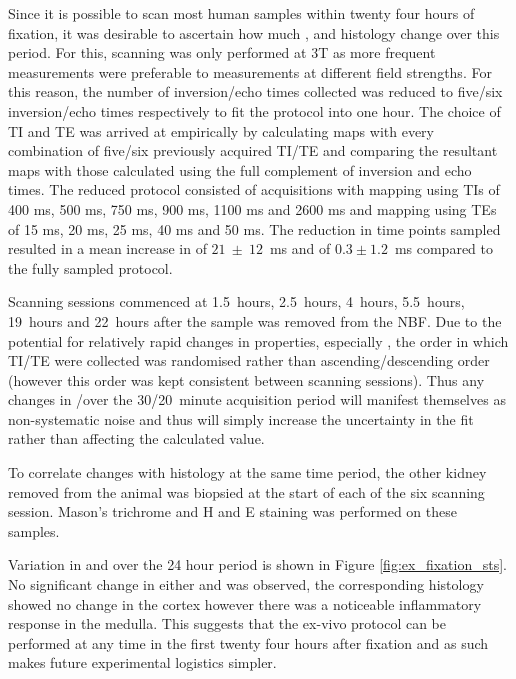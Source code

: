 Since it is possible to scan most human samples within twenty four hours of fixation, it was desirable to ascertain how much \tone, \ttwostar and histology change over this period. For this, scanning was only performed at 3T as more frequent measurements were preferable to measurements at different field strengths. For this reason, the number of inversion/echo times collected was reduced to five/six inversion/echo times respectively to fit the protocol into one hour. The choice of \ac{TI} and \ac{TE} was arrived at empirically by calculating maps with every combination of five/six previously acquired \ac{TI}/\ac{TE} and comparing the resultant maps with those calculated using the full complement of inversion and echo times. The reduced protocol consisted of acquisitions with \tone mapping using \acp{TI} of 400 ms, 500 ms, 750 ms, 900 ms, 1100 ms and 2600 ms and \ttwostar mapping using \acp{TE} of 15 ms, 20 ms, 25 ms, 40 ms and 50 ms. The reduction in time points sampled resulted in a mean increase in \tone of $21~\pm~12$~ms and \ttwostar of $0.3 \pm 1.2$~ms compared to the fully sampled protocol.

Scanning sessions commenced at 1.5~hours, 2.5~hours, 4~hours, 5.5~hours, 19~hours and 22~hours after the sample was removed from the \ac{NBF}. Due to the potential for relatively rapid changes in properties, especially \tone, the order in which \ac{TI}/\ac{TE} were collected was randomised rather than ascending/descending order (however this order was kept consistent between scanning sessions). Thus any changes in \tone/\ttwostar over the 30/20~minute acquisition period will manifest themselves as non-systematic noise and thus will simply increase the uncertainty in the fit rather than affecting the calculated value.

To correlate changes with histology at the same time period, the other kidney removed from the animal was biopsied at the start of each of the six scanning session. Mason's trichrome and \ac{H and E} staining was performed on these samples.

Variation in \tone and \ttwostar over the 24 hour period is shown in Figure \ref{fig:ex_fixation_sts}. No significant change in either \tone and \ttwostar was observed, the corresponding histology showed no change in the cortex however there was a noticeable inflammatory response in the medulla. This suggests that the ex-vivo protocol can be performed at any time in the first twenty four hours after fixation and as such makes future experimental logistics simpler.

